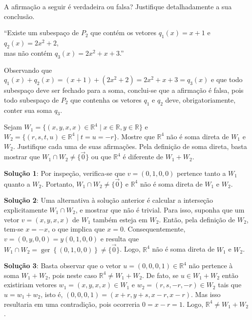 \documentclass[12pt,a4paper]{article}
\newcommand*\ger[1]{\operatorname{ger}\left\{#1\right\}}
\newcommand*\R{\mathbb{R}}
\begin{document}
\begin{ExerciseList}
\Exercise[title={2,0}] A afirmação a seguir é verdadeira ou falsa? Justifique detalhadamente a sua conclusão.
\begin{center}
``Existe um subespaço de $P_2$ que contém os vetores $q_1(x) = x+ 1$ e $q_2(x) = 2x^2 + 2$,\\ mas não contém $q_3(x) = 2x^2 + x + 3$.''
\end{center}
\Answer Observando que $q_1(x) + q_2(x) = (x+ 1) + (2x^2 + 2) = 2x^2 + x + 3 = q_3(x)$ e que todo subespaço deve ser fechado para a soma, conclui-se que a afirmação é falsa, pois todo subespaço de $P_2$ que contenha os vetores $q_1$ e $q_2$ deve, obrigatoriamente, conter sua soma $q_3$.

\Exercise[title={2,0}] Sejam
$W_1 = \{ (x,y,x,x) \in \R^4 \mid x \in \R, y \in \R \}$
e
$W_2 = \{ (r,s,t,u) \in \R^4 \mid t = u = -r\}$.
Mostre que $\R^4$ não é soma direta de $W_1$ e $W_2$. Justifique cada uma de suas afirmações.
\Answer Pela definição de soma direta, basta mostrar que $W_1 \cap W_2 \neq \{ \vec{0} \}$ ou que $\R^4$ é diferente de $W_1 + W_2$.

\textbf{Solução 1}: Por inspeção, verifica-se que $v=(0,1,0,0)$ pertence tanto a $W_1$ quanto a $W_2$. Portanto, $W_1 \cap W_2 \neq \{ \vec{0} \}$ e $\R^4$ não é soma direta de $W_1$ e $W_2$.

\textbf{Solução 2}: Uma alternativa à solução anterior é calcular a interseção explicitamente $W_1 \cap W_2$, e mostrar que não é trivial. Para isso, suponha que um vetor $v = (x,y,x,x)$ de $W_1$ também esteja em $W_2$. Então, pela definição de $W_2$, tem-se $x = -x$, o que implica que $x = 0$. Consequentemente, $v = (0,y,0,0) = y (0,1,0,0)$ e resulta que $W_1 \cap W_2 = \ger{(0,1,0,0)} \neq \{ \vec{0} \}$. Logo, $\R^4$ não é soma direta de $W_1$ e $W_2$.

\textbf{Solução 3}: Basta observar que o vetor $u = (0,0,0,1) \in \R^4$ não pertence à soma $W_1 + W_2$, pois neste caso $\R^4 \neq W_1 + W_2$. De fato, se $u \in W_1 + W_2$ então existiriam vetores $w_1 = (x,y,x,x) \in W_1$ e $w_2 = (r,s,-r,-r) \in W_2$ tais que $u = w_1 + w_2$, isto é, $(0,0,0,1) = (x+r,y+s,x-r,x-r)$. Mas isso resultaria em uma contradição, pois ocorreria $0 = x-r = 1$. Logo, $\R^4 \neq W_1 + W_2$.


\end{ExerciseList}
\end{document}
